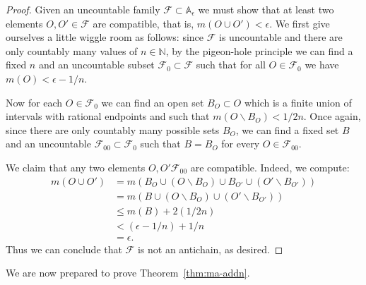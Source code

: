 \documentclass[11pt,oneside]{amsbook}
\newcommand{\N}{\mathbb N}
\theoremstyle{definition}
\theoremstyle{plain}
\theoremstyle{definition}
\theoremstyle{remark}
\numberwithin{equation}{section}
\numberwithin{figure}{section}
\begin{document}
\begin{proof}
  Given an uncountable family $\mathcal F\subset\mathbb A_\epsilon$ we must show that at least two elements $O,O'\in\mathcal F$ are compatible, that is, $m(O\cup O')<\epsilon$. We first give ourselves a little wiggle room as follows: since $\mathcal F$ is uncountable and there are only countably many values of $n\in\N$, by the pigeon-hole principle we can find a fixed $n$ and an uncountable subset $\mathcal F_0\subset\mathcal F$ such that for all $O\in\mathcal F_0$ we have $m(O)<\epsilon-1/n$.

  Now for each $O\in\mathcal F_0$ we can find an open set $B_O\subset O$ which is a finite union of intervals with rational endpoints and such that $m(O\smallsetminus B_O)<1/2n$. Once again, since there are only countably many possible sets $B_O$, we can find a fixed set $B$ and an uncountable $\mathcal F_{00}\subset\mathcal F_0$ such that $B=B_O$ for every $O\in\mathcal F_{00}$.

  We claim that any two elements $O,O'\mathcal F_{00}$ are compatible. Indeed, we compute:
  \begin{align*}
    m(O\cup O')&=m(B_O\cup(O\smallsetminus B_O)\cup B_{O'}\cup(O'\smallsetminus B_{O'}))\\
    &=m(B\cup(O\smallsetminus B_O)\cup(O'\smallsetminus B_{O'}))\\
    &\leq m(B)+2(1/2n)\\
    &<(\epsilon-1/n)+1/n\\
    &=\epsilon\text{.}
  \end{align*}
  Thus we can conclude that $\mathcal F$ is not an antichain, as desired.
\end{proof}

We are now prepared to prove Theorem~\ref{thm:ma-addn}.
\end{document}
